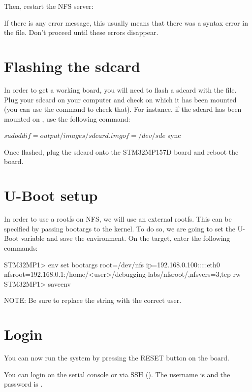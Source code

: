 Then, restart the NFS server:


If there is any error message, this usually means that there was a
syntax error in the  file. Don't proceed until these
errors disappear.

\section{Flashing the sdcard}

In order to get a working board, you will need to flash a sdcard with the 
 file. Plug your sdcard on your computer and
check on which  it has been mounted (you can use the 
command to check that). For instance, if the sdcard has been mounted on
, use the following command:

\begin{bashinput}
$ sudo dd if=output/images/sdcard.img of=/dev/sde
$ sync
\end{bashinput}

Once flashed, plug the sdcard onto the STM32MP157D board and reboot the board.

\section{U-Boot setup}

In order to use a rootfs on NFS, we will use an external rootfs. This can be
specified by passing bootargs to the kernel. To do so, we are going to set the
 U-Boot variable and save the environment. On the target, enter
the following commands:

\begin{bashinput}
STM32MP1> env set bootargs root=/dev/nfs ip=192.168.0.100:::::eth0
  nfsroot=192.168.0.1:/home/<user>/debugging-labs/nfsroot/,nfsvers=3,tcp rw
STM32MP1> saveenv
\end{bashinput}

NOTE: Be sure to replace the  string with the correct user.

\section{Login}

You can now run the system by pressing the RESET button on the board.

You can login on the serial console or via SSH (). The username is  and the password
is .
